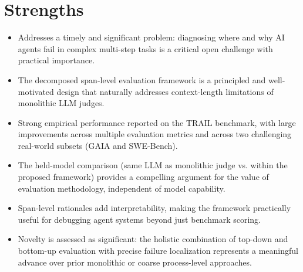 \documentclass[11pt]{article}
\begin{document}
\section*{Strengths}
\begin{itemize}[leftmargin=*]
  \item Addresses a timely and significant problem: diagnosing where and why AI agents fail in complex multi-step tasks is a critical open challenge with practical importance.
  \item The decomposed span-level evaluation framework is a principled and well-motivated design that naturally addresses context-length limitations of monolithic LLM judges.
  \item Strong empirical performance reported on the TRAIL benchmark, with large improvements across multiple evaluation metrics and across two challenging real-world subsets (GAIA and SWE-Bench).
  \item The held-model comparison (same LLM as monolithic judge vs. within the proposed framework) provides a compelling argument for the value of evaluation methodology, independent of model capability.
  \item Span-level rationales add interpretability, making the framework practically useful for debugging agent systems beyond just benchmark scoring.
  \item Novelty is assessed as significant: the holistic combination of top-down and bottom-up evaluation with precise failure localization represents a meaningful advance over prior monolithic or coarse process-level approaches.
\end{itemize}
\end{document}

